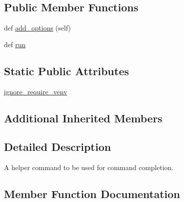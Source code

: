 \subsection*{Public Member Functions}
\begin{DoxyCompactItemize}
\item 
def \hyperlink{classpip_1_1__internal_1_1commands_1_1completion_1_1CompletionCommand_a1320b2c91d4d793abccc9a524bd028e4}{add\+\_\+options} (self)
\item 
def \hyperlink{classpip_1_1__internal_1_1commands_1_1completion_1_1CompletionCommand_a55d10bb4bfbdf9dcc3731befb05c3419}{run}
\end{DoxyCompactItemize}
\subsection*{Static Public Attributes}
\begin{DoxyCompactItemize}
\item 
\hyperlink{classpip_1_1__internal_1_1commands_1_1completion_1_1CompletionCommand_a4302141fdc1d9ed8fe329ff3420096d1}{ignore\+\_\+require\+\_\+venv}
\end{DoxyCompactItemize}
\subsection*{Additional Inherited Members}


\subsection{Detailed Description}
\begin{DoxyVerb}A helper command to be used for command completion.\end{DoxyVerb}
 

\subsection{Member Function Documentation}
\mbox{\label{classpip_1_1__internal_1_1commands_1_1completion_1_1CompletionCommand_a1320b2c91d4d793abccc9a524bd028e4}} 
